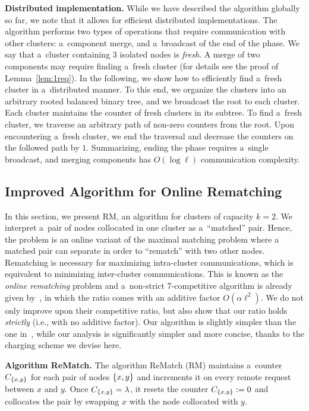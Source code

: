 \documentclass[a4paper,anonymous,USenglish]{lipics-v2019}
\newcommand{\RM}{\textsc{RM}\xspace} %
\DeclarePairedDelimiter\set{\{}{\}}
\begin{document}
\medskip
\noindent
\textbf{Distributed implementation.}
While we have described the algorithm globally so far, we note that it allows for efficient distributed implementations. 
The algorithm performs two types of operations that require communication with other clusters: a~component merge, and a~broadcast of the end of the phase.
We say that a~cluster containing $3$ isolated nodes is \emph{fresh}.
A merge of two components may require finding a~fresh cluster (for details see the proof of Lemma~\ref{lem:1req}).
In the following, we show how to efficiently find a~fresh cluster in a~distributed manner.
To this end, we organize the clusters into an arbitrary rooted balanced binary tree, and we broadcast the root to each cluster.
Each cluster maintains the counter of fresh clusters in its subtree.
To find a~fresh cluster, we traverse an arbitrary path of non-zero counters from the root.
Upon encountering a~fresh cluster, we end the traversal and decrease the counters on the followed path by $1$.
Summarizing, ending the phase requires a~single broadcast, and merging components has $O(\log \ell)$ communication complexity.

\subsection{Improved Algorithm for Online Rematching} \label{sec:k2}
In this section,
we present \RM,
 an algorithm for clusters of capacity $k=2$.
We interpret a~pair of nodes collocated in one cluster as a~``matched'' pair.
Hence,
the problem is an online variant of the maximal matching problem where
a matched pair can separate in order to ``rematch'' with two other nodes.
Rematching is necessary for  maximizing intra-cluster communications,
which is equivalent to minimizing inter-cluster communications.
This is known as the  \emph{online rematching} 
problem and a~non-strict 7-competitive algorithm is already given by~\cite{repartition-disc},
in which the ratio comes with an additive factor $O(\alpha\ell^2)$.
We do not only improve upon their competitive ratio,
but also show that our ratio holds \emph{strictly}
(i.e., with no additive factor).
Our algorithm is slightly simpler than the one in~\cite{repartition-disc}, 
while our analysis is significantly simpler and more concise,
thanks to the charging scheme we devise here.


\noindent
\textbf{Algorithm ReMatch.} 
The algorithm ReMatch (\RM) maintains a~counter $C_{\set{x,y}}$ for each pair of nodes $\set{x,y}$ and increments it on every remote request between $x$ and $y$.
Once $C_{\set{x,y}} = \lambda$,
it resets the counter $C_{\set{x,y}}:=0$ and collocates the pair by swapping $x$ with the node collocated with $y$.
\end{document}
